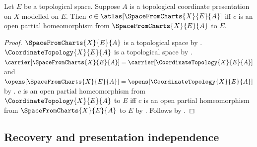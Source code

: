\begin{theorem}\label{space_from_charts_chart_iff}
    Let $E$ be a topological space.
    Suppose $A$ is a topological coordinate presentation on $X$ modelled on $E$.
    Then $c\in\atlas[\SpaceFromCharts{X}{E}{A}]$ iff
        $c$ is an open partial homeomorphism from $\SpaceFromCharts{X}{E}{A}$ to $E$.
\end{theorem}
\begin{proof}
    $\SpaceFromCharts{X}{E}{A}$ is a topological space by
        .
    $\CoordinateTopology{X}{E}{A}$ is a topological space by .
    $\carrier[\SpaceFromCharts{X}{E}{A}]=\carrier[\CoordinateTopology{X}{E}{A}]$ and
        $\opens[\SpaceFromCharts{X}{E}{A}]=\opens[\CoordinateTopology{X}{E}{A}]$ by
        .
    $c$ is an open partial homeomorphism from $\CoordinateTopology{X}{E}{A}$ to $E$ iff
        $c$ is an open partial homeomorphism from $\SpaceFromCharts{X}{E}{A}$ to $E$ by
        .
    Follows by .
\end{proof}

\subsection{Recovery and presentation independence}

